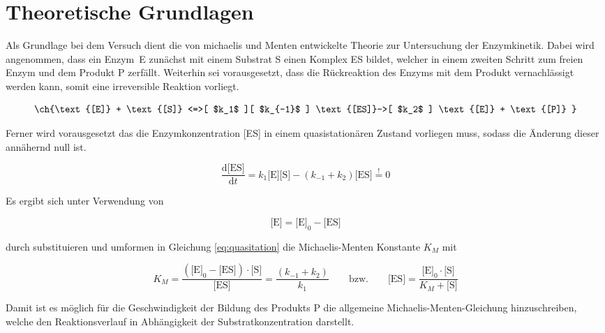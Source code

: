 \setlength\abovedisplayshortskip{20pt}
\setlength\belowdisplayshortskip{20pt}
\setlength\abovedisplayskip{20pt}
\setlength\belowdisplayskip{20pt}

\section{Theoretische Grundlagen}

Als Grundlage bei dem Versuch dient die von michaelis und Menten \cite{mmquelle}entwickelte Theorie zur Untersuchung der Enzymkinetik. Dabei wird angenommen, dass ein Enzym~E zunächst mit einem Substrat S einen Komplex ES bildet, welcher in einem zweiten Schritt zum freien Enzym und dem Produkt P zerfällt. Weiterhin sei vorausgesetzt, dass die Rückreaktion des Enzyms mit dem Produkt vernachlässigt werden kann, somit eine irreversible Reaktion vorliegt. 

\begin{equation}
\ch{\text{[E]} + \text{[S]} <=>[ $k_1$ ][ $k_{-1}$ ] \text{[ES]}->[ $k_2$ ] \text{[E]} + \text{[P]} }
\end{equation}


Ferner wird vorausgesetzt das die Enzymkonzentration [ES] in einem quasistationären Zustand vorliegen muss, sodass die Änderung dieser annähernd null ist.

\begin{equation}
\frac{\text{d[ES]}}{\text{d}t} = k_1\text{[E][S]}-\left(k_{-1} + k_2\right)\text{[ES]} \stackrel{!}{=} 0
\label{eq:quasitation}
\end{equation}

Es ergibt sich unter Verwendung von

\begin{equation}
\text{[E]} = \text{[E]}_0-\text{[ES]}
\end{equation}

durch substituieren und umformen in Gleichung \ref{eq:quasitation}  die Michaelis-Menten Konstante $K_M$ mit

\begin{equation}
K_M=\frac{\left(\text{[E]}_0-\text{[ES]}\right)\cdot \text{[S]}}{\text{[ES]}}=\frac{\left(k_{-1} + k_2\right)}{k_1}\quad\quad\text{bzw.}\quad\quad 
\text{[ES]}=\frac{\text{[E]}_0\cdot \text{[S]}}{K_M+\text{[S]}}
\label{eq:MMkonstante}
\end{equation}

Damit ist es möglich für die Geschwindigkeit der Bildung des Produkts P die allgemeine Michaelis-Menten-Gleichung hinzuschreiben, welche den Reaktionsverlauf in Abhängigkeit der Substratkonzentration darstellt.

